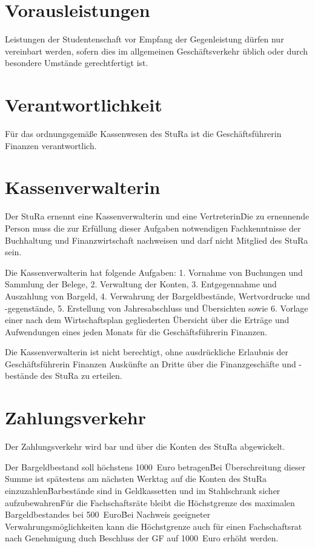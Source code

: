 \begin{multicols}{2}
\section{Vorausleistungen}

\Abs \Satz Leistungen der Studentenschaft vor Empfang der Gegenleistung dürfen nur vereinbart werden, sofern dies im allgemeinen Geschäftsverkehr üblich oder durch besondere Umstände gerechtfertigt ist.



\section{Verantwortlichkeit}

\Abs \Satz Für das ordnungsgemäße Kassenwesen des StuRa ist die Geschäftsführerin Finanzen verantwortlich.



\section{Kassenverwalterin}

\Abs \Satz Der StuRa ernennt eine Kassenverwalterin und eine Vertreterin\. Die zu ernennende Person muss die zur Erfüllung dieser Aufgaben notwendigen Fachkenntnisse der Buchhaltung und Finanzwirtschaft nachweisen und darf nicht Mitglied des StuRa sein.

\Abs \Satz Die Kassenverwalterin hat folgende Aufgaben:
1. Vornahme von Buchungen und Sammlung der Belege,
2. Verwaltung der Konten,
3. Entgegennahme und Auszahlung von Bargeld,
4. Verwahrung der Bargeldbestände, Wertvordrucke und -gegenstände,
5. Erstellung von Jahresabschluss und Übersichten sowie
6. Vorlage einer nach dem Wirtschaftsplan gegliederten Übersicht über die Erträge und Aufwendungen eines jeden Monats für die Geschäftsführerin Finanzen.

\Abs \Satz Die Kassenverwalterin ist nicht berechtigt, ohne ausdrückliche Erlaubnis der Geschäftsführerin Finanzen Auskünfte an Dritte über die Finanzgeschäfte und -bestände des StuRa zu erteilen.



\section{Zahlungsverkehr}

\Abs \Satz Der Zahlungsverkehr wird bar und über die Konten des StuRa abgewickelt.

\Abs \Satz Der Bargeldbestand soll höchstens 1000~Euro betragen\. Bei Überschreitung dieser Summe ist spätestens am nächsten Werktag auf die Konten des StuRa einzuzahlen\. Barbestände sind in Geldkassetten und im Stahlschrank sicher aufzubewahren\. Für die Fachschaftsräte bleibt die Höchstgrenze des maximalen Bargeldbestandes bei 500~Euro\. Bei Nachweis geeigneter Verwahrungsmöglichkeiten kann die Höchstgrenze auch für einen Fachschaftsrat nach Genehmigung duch Beschluss der GF auf 1000~Euro erhöht werden.


\end{multicols}
